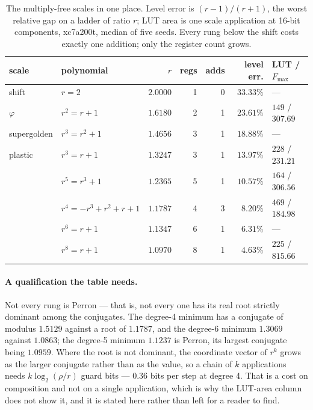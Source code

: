 \documentclass[11pt]{article}
\theoremstyle{definition}
\begin{document}
\begin{table}[t]\centering
\caption{The multiply-free scales in one place. Level error is $(r-1)/(r+1)$,
the worst relative gap on a ladder of ratio $r$; LUT area is one scale
application at 16-bit components, xc7a200t, median of five seeds. Every rung
below the shift costs exactly one addition; only the register count grows.}
\label{tab:allscales}
\begin{tabular}{llrrrrl}
\toprule
scale & polynomial & $r$ & regs & adds & level err. & LUT / $F_{\max}$ \\
\midrule
shift        & $r=2$              & $2.0000$ & 1 & 0 & $33.33\%$ & --- \\
$\varphi$    & $r^2=r+1$          & $1.6180$ & 2 & 1 & $23.61\%$ & $149$ / $307.69$ \\
supergolden  & $r^3=r^2+1$        & $1.4656$ & 3 & 1 & $18.88\%$ & --- \\
plastic      & $r^3=r+1$          & $1.3247$ & 3 & 1 & $13.97\%$ & $228$ / $231.21$ \\
             & $r^5=r^3+1$        & $1.2365$ & 5 & 1 & $10.57\%$ & $164$ / $306.56$ \\
             & $r^4{=}{-}r^3{+}r^2{+}r{+}1$ & $1.1787$ & 4 & 3 & $8.20\%$ & $469$ / $184.98$ \\
             & $r^6=r+1$          & $1.1347$ & 6 & 1 & $6.31\%$ & --- \\
             & $r^8=r+1$          & $1.0970$ & 8 & 1 & $4.63\%$ & $225$ / $815.66$ \\
\bottomrule
\end{tabular}
\end{table}

\paragraph{A qualification the table needs.} Not every rung is Perron --- that
is, not every one has its real root strictly dominant among the conjugates. The
degree-4 minimum has a conjugate of modulus $1.5129$ against a root of
$1.1787$, and the degree-6 minimum $1.3069$ against $1.0863$; the degree-5
minimum $1.1237$ is Perron, its largest conjugate being $1.0959$. Where the
root is not dominant, the coordinate vector of $r^{k}$ grows as the larger
conjugate rather than as the value, so a chain of $k$ applications needs
$k\log_2(\rho/r)$ guard bits --- $0.36$ bits per step at degree 4. That is a cost
on composition and not on a single application, which is why the LUT-area column
does not show it, and it is stated here rather than left for a reader to find.
\end{document}
